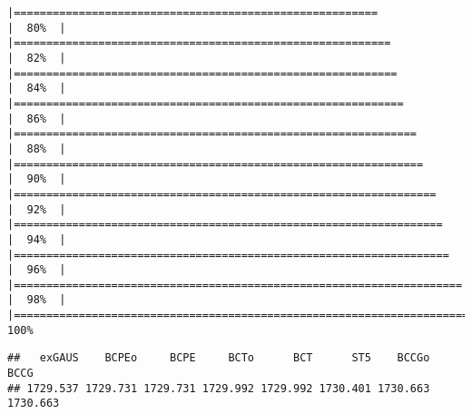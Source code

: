 \begin{verbatim}
|========================================================              |  80%  |                                                                              |==========================================================            |  82%  |                                                                              |===========================================================           |  84%  |                                                                              |============================================================          |  86%  |                                                                              |==============================================================        |  88%  |                                                                              |===============================================================       |  90%  |                                                                              |=================================================================     |  92%  |                                                                              |==================================================================    |  94%  |                                                                              |===================================================================   |  96%  |                                                                              |===================================================================== |  98%  |                                                                              |======================================================================| 100%
\end{verbatim}

\begin{Shaded}
\begin{Highlighting}[]
\SpecialCharTok{$}\NormalTok{fits[}\SpecialCharTok{:}\NormalTok{]}
\end{Highlighting}
\end{Shaded}

\begin{verbatim}
##   exGAUS    BCPEo     BCPE     BCTo      BCT      ST5    BCCGo     BCCG 
## 1729.537 1729.731 1729.731 1729.992 1729.992 1730.401 1730.663 1730.663
\end{verbatim}

\begin{Shaded}
\begin{Highlighting}[]
\OtherTok{\textless{}{-}} \SpecialCharTok{\textasciitilde{}} \NormalTok{, }
\end{Highlighting}
\end{Shaded}

